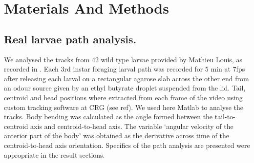 \documentclass[10pt,a4paper]{article}
\begin{document}
\section{Materials And Methods}
\subsection{Real larvae path analysis.}
We analysed the tracks from 42 wild type larvae provided by Mathieu Louis, as recorded in \cite{gomez2011active}. Each 3rd instar foraging larval path was recorded for 5 min at 7fps after releasing each larval on a rectangular agarose slab across the other end from an odour source given by an ethyl butyrate droplet suspended from the lid. Tail, centroid and head positions where extracted from each frame of the video using custom tracking software at CRG (see ref). We used here Matlab to analyse the tracks. Body bending was calculated as the angle formed between the tail-to-centroid axis and centroid-to-head axis. The variable ‘angular velocity of the anterior part of the body’ was obtained as the derivative across time of the centroid-to-head axis orientation. Specifics of the path analysis are presented were appropriate in the result sections. 
\end{document}
